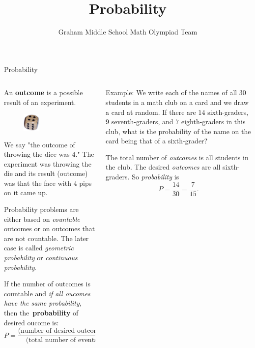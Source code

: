 \documentclass[9pt,aspectratio=169]{beamer}
\title{Probability}
\subtitle[Graham Middle School]{Graham Middle School Math Olympiad Team}
\begin{document}
\maketitle

\begin{frame}{Probability}
  \begin{columns}[T]
    \begin{column}{0.5\textwidth}
      \begin{definition}
        An \textbf{outcome} is a possible result of an experiment.
      \end{definition}

      \begin{figure}%
        \vspace{-1em}
        \includegraphics[width=0.3\textwidth]{03 - Probability/dice-4.png}
      \end{figure}
      We say "the outcome of throwing the dice was $4$." The experiment was throwing the die and its result (outcome) was that the face with $4$ pips on it came up.\medskip
  
      Probability problems are either based on \emph{countable} outcomes or on outcomes that are not countable. The later case is called \emph{geometric probability} or \emph{continuous probability}.

      \begin{definition}
        If the number of outcomes is countable and \emph{if all oucomes have the same probability}, then \mbox{the~\textbf{probability}} of desired oucome is:
        \[ P = \frac{\text{(number of desired outcomes)}}{\text{(total number of events)}}. \]
        \vspace*{-1ex}
      \end{definition}
    \end{column}
    \begin{column}{0.5\textwidth}
      \begin{problem}
        {\color{textBlue} Example:} We write each of the names of all $30$ students in a math club on a card and we draw a card at random. If there are $14$ sixth-graders, $9$ seventh-graders, and $7$ eighth-graders in this club, what is the probability of the name on the card being that of a sixth-grader? 
      \end{problem}
      The total number of \emph{outcomes} is all students in the club. The desired \emph{outcomes} are all sixth-graders. So \emph{probability} is
      \[
        P = \frac{14}{30} = \frac{7}{15}.
      \]


\end{column}
\end{columns}
\end{frame}
\end{document}

